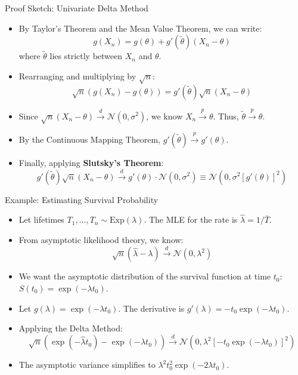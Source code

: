 \documentclass[
  ignorenonframetext,
]{beamer}
\providecommand{\tightlist}{%
  \setlength{\itemsep}{0pt}\setlength{\parskip}{0pt}}
\begin{document}
\begin{frame}{Proof Sketch: Univariate Delta Method}
\label{proof-sketch-univariate-delta-method}
\begin{itemize}
\tightlist
\item
  By Taylor's Theorem and the Mean Value Theorem, we can write:
  \[g(X_n) = g(\theta) + g'(\tilde{\theta})(X_n - \theta)\] where
  \(\tilde{\theta}\) lies strictly between \(X_n\) and \(\theta\).
\item
  Rearranging and multiplying by \(\sqrt{n}\):
  \[\sqrt{n}(g(X_n) - g(\theta)) = g'(\tilde{\theta})\sqrt{n}(X_n - \theta)\]
\item
  Since
  \(\sqrt{n}(X_n - \theta) \xrightarrow{d} \mathcal{N}(0, \sigma^2)\),
  we know \(X_n \xrightarrow{p} \theta\). Thus,
  \(\tilde{\theta} \xrightarrow{p} \theta\).
\item
  By the Continuous Mapping Theorem,
  \(g'(\tilde{\theta}) \xrightarrow{p} g'(\theta)\).
\item
  Finally, applying \textbf{Slutsky's Theorem}:
  \[g'(\tilde{\theta})\sqrt{n}(X_n - \theta) \xrightarrow{d} g'(\theta) \cdot \mathcal{N}(0, \sigma^2) \equiv \mathcal{N}\left(0, \sigma^2 [g'(\theta)]^2\right)\]
\end{itemize}
\end{frame}

\begin{frame}{Example: Estimating Survival Probability}
\label{example-estimating-survival-probability}
\begin{itemize}
\tightlist
\item
  Let lifetimes \(T_1, \dots, T_n \sim \text{Exp}(\lambda)\). The MLE
  for the rate is \(\hat{\lambda} = 1/\bar{T}\).
\item
  From asymptotic likelihood theory, we know:
  \[\sqrt{n}(\hat{\lambda} - \lambda) \xrightarrow{d} \mathcal{N}(0, \lambda^2)\]
\item
  We want the asymptotic distribution of the survival function at time
  \(t_0\): \(S(t_0) = \exp(-\lambda t_0)\).
\item
  Let \(g(\lambda) = \exp(-\lambda t_0)\). The derivative is
  \(g'(\lambda) = -t_0 \exp(-\lambda t_0)\).
\item
  Applying the Delta Method:
  \[\sqrt{n}\left(\exp(-\hat{\lambda} t_0) - \exp(-\lambda t_0)\right) \xrightarrow{d} \mathcal{N}\left(0, \lambda^2 \left[-t_0 \exp(-\lambda t_0)\right]^2\right)\]
\item
  The asymptotic variance simplifies to
  \(\lambda^2 t_0^2 \exp(-2\lambda t_0)\).
\end{itemize}
\end{frame}
\end{document}
